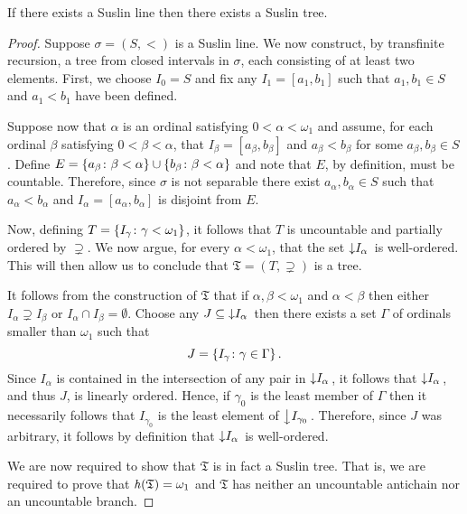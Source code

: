 \begin{lem}\label{lem:ltree}
	If there exists a Suslin line then there exists a Suslin tree.
\end{lem}
\begin{proof}
	Suppose $\sigma=(S,<)$ is a Suslin line.  We now construct, by transfinite
	recursion, a tree from closed intervals in $\sigma$, each consisting of at least
	two elements.  First, we choose $I_0=S$ and fix any $I_1=[a_1,b_1]$ such that
	$a_1,b_1\in S$ and $a_1<b_1$ have been defined.

	Suppose now that $\alpha$ is an ordinal satisfying $0<\alpha<\omega_1$ and
	assume, for each ordinal $\beta$ satisfying $0<\beta<\alpha$, that
	$I_\beta=[a_\beta,b_\beta]$ and $a_\beta<b_\beta$ for some
	$a_\beta,b_\beta\in S$.  Define
	$E=\left\lbrace a_\beta\colon \beta<\alpha \right\rbrace\cup\left\lbrace b_\beta\colon \beta<\alpha \right\rbrace$ and
	note that $E$, by definition, must be countable.  Therefore, since $\sigma$ is
	not separable there exist $a_\alpha,b_\alpha\in S$ such that
	$a_\alpha<b_\alpha$ and $I_\alpha=[a_\alpha,b_\alpha]$ is disjoint from $E$.

	Now, defining $T=\left\lbrace I_\gamma\colon \gamma<\omega_1 \right\rbrace$, it follows that $T$ is
	uncountable and partially ordered by $\supsetneq$.  We now argue, for every
	$\alpha<\omega_1$, that the set $\left\downarrow I_\alpha\right.$ is well-ordered.  This
	will then allow us to conclude that $\mathfrak{T}=(T,\supsetneq)$ is a tree.

	It follows from the construction of $\mathfrak{T}$ that if
	$\alpha,\beta<\omega_1$ and $\alpha<\beta$ then either
	$I_\alpha\supsetneq I_\beta$ or $I_\alpha\cap I_\beta=\emptyset$.  Choose
	any $J\subseteq \left\downarrow I_{\alpha}\right.$ then there exists a set $\Gamma$ of
	ordinals smaller than $\omega_{1}$ such that
	\begin{equation}
		J=\left\lbrace I_{\gamma}\colon \gamma\in\Gamma \right\rbrace.
	\end{equation}
	Since $I_{\alpha}$ is contained in the intersection of any pair in
	$\left\downarrow I_{\alpha}\right.$, it follows that $\left\downarrow I_{\alpha}\right.$, and thus $J$, is
	linearly ordered.  Hence, if $\gamma_{0}$ is the least member of $\Gamma$ then
	it necessarily follows that $I_{\gamma_{0}}$ is the least element of
	$\left\downarrow I_{\gamma_{0}}\right.$.  Therefore, since $J$ was arbitrary, it follows by
	definition that $\left\downarrow I_{\alpha}\right.$ is well-ordered.

	We are now required to show that $\mathfrak{T}$ is in fact a Suslin tree.
	That is, we are required to prove that $\mathit{h}(\mathfrak{T})=\omega_1$ and
	$\mathfrak{T}$ has neither an uncountable antichain nor an uncountable branch.


\end{proof}
